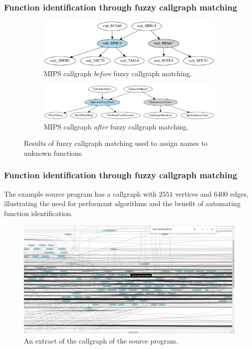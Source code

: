 \begin{frame}
	\frametitle{Function identification through fuzzy callgraph matching}

	\begin{figure}[htbp]
		\begin{subfigure}{1\textwidth}
			\centering
			\includegraphics[width=0.7\linewidth]{inc/example/callgraph_ppc_before.png}
			\caption{MIPS callgraph \textit{before} fuzzy callgraph matching.}
		\end{subfigure}
		\begin{subfigure}{1\textwidth}
			\centering
			\vspace*{1em}
			\includegraphics[width=0.9\linewidth]{inc/example/callgraph_ppc_after.png}
			\caption{MIPS callgraph \textit{after} fuzzy callgraph matching.}
		\end{subfigure}
		\caption{Results of fuzzy callgraph matching used to assign names to unknown functions.}
	\end{figure}

\end{frame}

\begin{frame}
	\frametitle{Function identification through fuzzy callgraph matching}

	The example source program has a callgraph with $2551$ vertices and $6400$ edges, illustrating the need for performant algorithms and the benefit of automating function identification.

	\begin{figure}[htbp]
		\centering
		\includegraphics[width=0.85\linewidth]{inc/example/full_callgraph.png}
		\caption{An extract of the callgraph of the source program.}
	\end{figure}
\end{frame}

